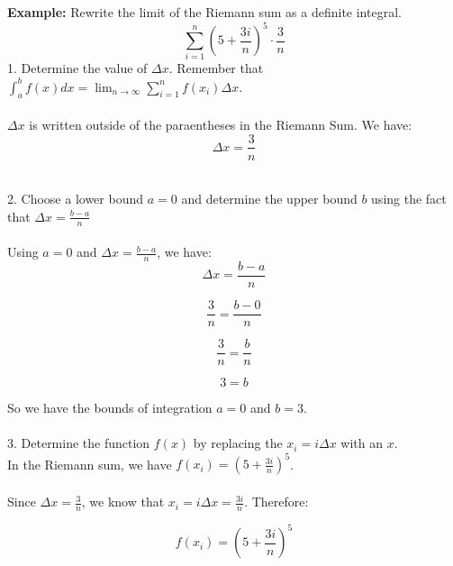 \begin{framed}
  \noindent \textbf{Example:}
  Rewrite the limit of the Riemann sum as a definite integral. 
  \begin{equation*}
    \sum_{i=1}^{n} \left(5 + \frac{3i}{n}\right)^5 \cdot \frac{3}{n}
  \end{equation*}
  1. Determine the value of $\Delta x$. Remember that $ \int_a^b f(x)dx = 
        \lim_{n \to \infty} \sum_{i=1}^{n} f(x_i) \Delta x.$\\\\
  $\Delta x$ is written outside of the paraentheses in the Riemann Sum. We have:
  \begin{equation*}
    \Delta x = \frac{3}{n}
  \end{equation*}

  \noindent \\2. Choose a lower bound $a=0$ and determine the upper bound $b$ 
  using the fact that $\Delta x = \frac{b-a}{n}$\\\\

  Using $a = 0$ and $\Delta x = \frac{b - a}{n}$, we have:
  \begin{equation*}
    \Delta x = \frac{b - a}{n}
  \end{equation*}

  \begin{equation*}
    \frac{3}{n} = \frac{b - 0}{n}
  \end{equation*}

  \begin{equation*}
    \frac{3}{n} = \frac{b}{n}
  \end{equation*}

  \begin{equation*}
    3 = b
  \end{equation*}

  \noindent So we have the bounds of integration $a = 0$ and $b = 3$.\\\\
  3. Determine the function $f(x)$ by replacing the $x_i = i \Delta x$ with 
  an $x$.\\

  \noindent In the Riemann sum, we have 
  $f(x_i)=\left(5+\frac{3i}{n}\right)^5$.\\\\
  \noindent Since $\Delta x = \frac{3}{n}$, we know that $x_i=i\Delta x 
  = \frac{3i}{n}$. Therefore:

  \begin{equation*}
    f(x_i) = \left(5+\frac{3i}{n}\right)^5
  \end{equation*}


\end{framed}
